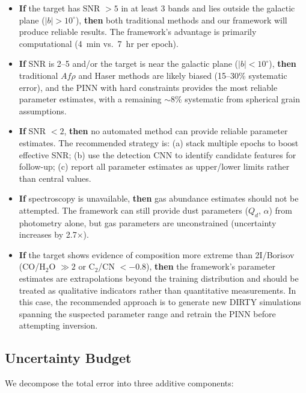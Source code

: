 \documentclass[preprint2]{aastex631}
\begin{document}
\begin{itemize}
    \item \textbf{If} the target has SNR $>5$ in at least 3 bands and lies outside the galactic plane ($|b| > 10^\circ$), \textbf{then} both traditional methods and our framework will produce reliable results. The framework's advantage is primarily computational (4~min vs.\ 7~hr per epoch).

    \item \textbf{If} SNR is 2--5 and/or the target is near the galactic plane ($|b| < 10^\circ$), \textbf{then} traditional $Af\rho$ and Haser methods are likely biased (15--30\% systematic error), and the PINN with hard constraints provides the most reliable parameter estimates, with a remaining $\sim$8\% systematic from spherical grain assumptions.

    \item \textbf{If} SNR $<2$, \textbf{then} no automated method can provide reliable parameter estimates. The recommended strategy is: (a) stack multiple epochs to boost effective SNR; (b) use the detection CNN to identify candidate features for follow-up; (c) report all parameter estimates as upper/lower limits rather than central values.

    \item \textbf{If} spectroscopy is unavailable, \textbf{then} gas abundance estimates should not be attempted. The framework can still provide dust parameters ($Q_d$, $\alpha$) from photometry alone, but gas parameters are unconstrained (uncertainty increases by 2.7$\times$).

    \item \textbf{If} the target shows evidence of composition more extreme than 2I/Borisov (CO/H$_2$O $\gg 2$ or C$_2$/CN $<-0.8$), \textbf{then} the framework's parameter estimates are extrapolations beyond the training distribution and should be treated as qualitative indicators rather than quantitative measurements. In this case, the recommended approach is to generate new DIRTY simulations spanning the suspected parameter range and retrain the PINN before attempting inversion.
\end{itemize}

\subsection{Uncertainty Budget}\label{sec:uncertainty_budget}

We decompose the total error into three additive components:
\end{document}
